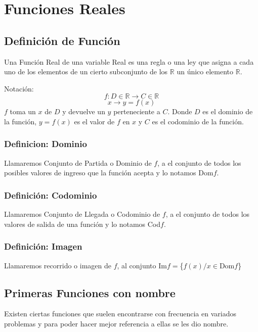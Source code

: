 
\chapter{Funciones Reales}\label{cap.Funcines}

\section{Definición de Función}
Una Función Real de una variable Real es una regla o una ley que asigna a cada uno de los elementos de un cierto subconjunto de los $\mathbb{R}$ un único elemento $\mathbb{R}$.

Notación:
$$f: D \in \mathbb{R} \longrightarrow C \in \mathbb{R}$$ 
$$x \longrightarrow y = f(x)$$
$f$ toma un $x$ de $D$ y devuelve un $y$ perteneciente a $C$. Donde $D$ es el dominio de la función, $y=f(x)$ es el valor de $f$ en $x$ y $C$ es el codominio de la función. 
\subsection{Definicion: Dominio}
Llamaremos Conjunto de Partida o Dominio de $f$, a el conjunto de todos los posibles valores de ingreso que la función acepta y lo notamos Dom$f$.
\subsection{Definición: Codominio}
Llamaremos Conjunto de Llegada o Codominio de $f$, a el conjunto de todos los valores de salida de una función y lo notamos Cod$f$.
\subsection{Definición: Imagen}
Llamaremos recorrido o imagen de $f$, al conjunto Im$f=$\{$f(x)/x \in $Dom$f$\}
\section{Primeras Funciones con nombre}
Existen ciertas funciones que suelen encontrarse con frecuencia en variados problemas y para poder hacer mejor referencia a ellas se les dio nombre.
